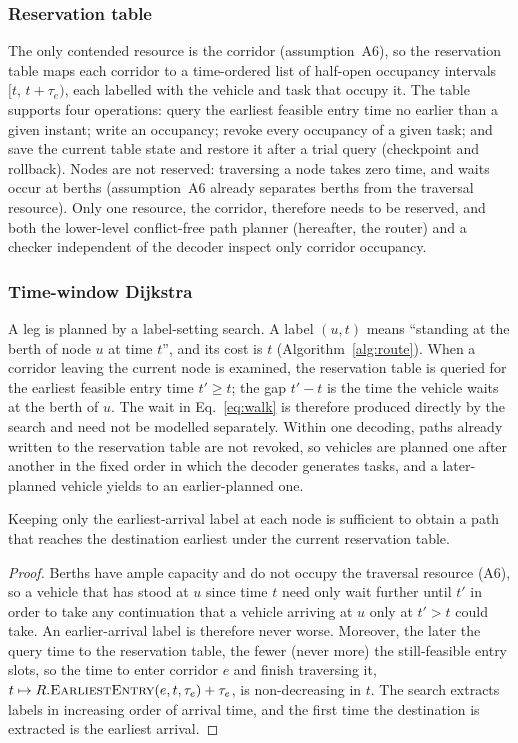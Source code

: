 \subsubsection{Reservation table}
The only contended resource is the corridor (assumption~A6), so the reservation table maps each corridor to a time-ordered list of half-open occupancy intervals $[t,\,t+\tau_e)$, each labelled with the vehicle and task that occupy it.
The table supports four operations: query the earliest feasible entry time no earlier than a given instant; write an occupancy; revoke every occupancy of a given task; and save the current table state and restore it after a trial query (checkpoint and rollback).
Nodes are not reserved: traversing a node takes zero time, and waits occur at berths (assumption~A6 already separates berths from the traversal resource).
Only one resource, the corridor, therefore needs to be reserved, and both the lower-level conflict-free path planner (hereafter, the router) and a checker independent of the decoder inspect only corridor occupancy.

\subsubsection{Time-window Dijkstra}
A leg is planned by a label-setting search. A label $(u,t)$ means ``standing at the berth of node $u$ at time $t$'', and its cost is $t$ (Algorithm~\ref{alg:route}).
When a corridor leaving the current node is examined, the reservation table is queried for the earliest feasible entry time $t'\ge t$; the gap $t'-t$ is the time the vehicle waits at the berth of $u$.
The wait in Eq.~\eqref{eq:walk} is therefore produced directly by the search and need not be modelled separately.
Within one decoding, paths already written to the reservation table are not revoked, so vehicles are planned one after another in the fixed order in which the decoder generates tasks, and a later-planned vehicle yields to an earlier-planned one.

\begin{lem}
\label{lem:label}
Keeping only the earliest-arrival label at each node is sufficient to obtain a path that reaches the destination earliest under the current reservation table.
\end{lem}

\begin{proof}
  Berths have ample capacity and do not occupy the traversal resource (A6), so a vehicle that has stood at $u$ since time $t$ need only wait further until $t'$
  in order to take any continuation that a vehicle arriving at $u$ only at $t'>t$ could take.
  An earlier-arrival label is therefore never worse.
  Moreover, the later the query time to the reservation table, the fewer (never more) the still-feasible entry slots,
  so the time to enter corridor $e$ and finish traversing it,
  $t\mapsto R.\textsc{EarliestEntry}(e,t,\tau_e)+\tau_e$,
  is non-decreasing in $t$.
  The search extracts labels in increasing order of arrival time, and the first time the destination is extracted is the earliest arrival.
\end{proof}

